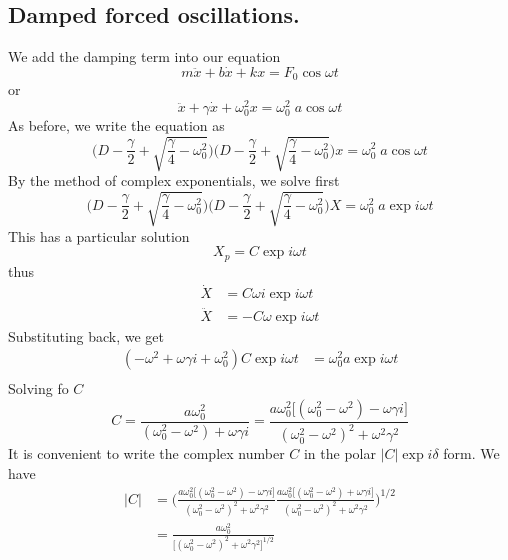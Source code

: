 \documentclass[../../../main.tex]{subfiles}
\begin{document}
\subsection*{Damped forced oscillations.} We add the damping term into our equation
\begin{equation*}
    m\ddot{x}+b\dot{x}+kx=F_0 \cos \omega t
\end{equation*}
or
\begin{equation*}
    \ddot{x}+\gamma\dot{x}+\omega_0^2x=\omega_0^2\;a \cos \omega t
\end{equation*}
As before, we write the equation as 
\begin{equation*}
    \biggl(D-\frac{\gamma}{2}+\sqrt{\frac{\gamma}{4}-\omega_0^2}\biggr)\biggl(D-\frac{\gamma}{2}+\sqrt{\frac{\gamma}{4}-\omega_0^2}\biggr)x=\omega_0^2\;a \cos \omega t
\end{equation*}
By the method of complex exponentials, we solve first
\begin{equation*}
    \biggl(D-\frac{\gamma}{2}+\sqrt{\frac{\gamma}{4}-\omega_0^2}\biggr)\biggl(D-\frac{\gamma}{2}+\sqrt{\frac{\gamma}{4}-\omega_0^2}\biggr)X=\omega_0^2\;a \exp i\omega t
\end{equation*}
This has a particular solution
\begin{equation*}
    X_p=C\exp i\omega t
\end{equation*}
thus 
\begin{align*}
    \dot{X}&=C\omega i \exp i\omega t\\
    \ddot{X}&=-C\omega \exp i\omega t
\end{align*}
Substituting back, we get
\begin{align*}
    (-\omega^2+\omega \gamma i+\omega_0^2)C\exp{i\omega t}&=\omega_0^2a\exp{i\omega t}\\
\end{align*}
Solving fo $C$
\begin{equation*}
    C=\frac{a\omega_0^2}{(\omega_0^2-\omega^2)+\omega\gamma i}= \frac{a\omega_0^2 \big[(\omega_0^2-\omega^2)-\omega\gamma i\big]}{(\omega_0^2- \omega^2)^2 +\omega^2\gamma^2 }
\end{equation*}
It is convenient to write the complex number $C$ in the polar $|C|\exp i \delta$ form. We have
\begin{align*}
    |C|&=\Biggl( \frac{a\omega_0^2 \big[(\omega_0^2-\omega^2)-\omega\gamma i\big]}{(\omega_0^2- \omega^2)^2 +\omega^2\gamma^2 } \frac{a\omega_0^2 \big[(\omega_0^2-\omega^2)+\omega\gamma i\big]}{(\omega_0^2- \omega^2)^2 +\omega^2\gamma^2 }\Biggr)^{1/2}\\
    &= \frac{a\omega_0^2 }{\big[(\omega_0^2- \omega^2)^2 +\omega^2\gamma^2\big]^{1/2} }
\end{align*}
\end{document}
